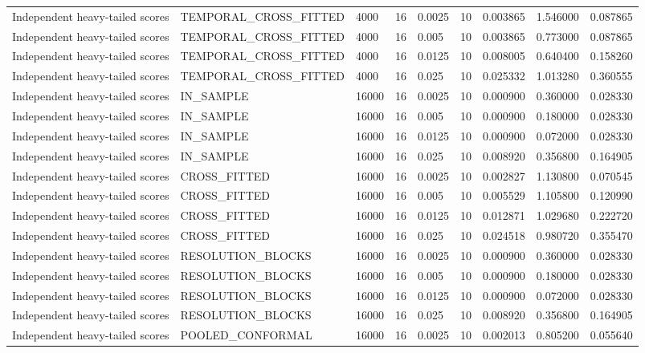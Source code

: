 \begin{tabular}{lllllllll}
Independent heavy-tailed scores & TEMPORAL\_CROSS\_FITTED & 4000 & 16 & 0.0025 & 10 & 0.003865 & 1.546000 & 0.087865 \\
Independent heavy-tailed scores & TEMPORAL\_CROSS\_FITTED & 4000 & 16 & 0.005 & 10 & 0.003865 & 0.773000 & 0.087865 \\
Independent heavy-tailed scores & TEMPORAL\_CROSS\_FITTED & 4000 & 16 & 0.0125 & 10 & 0.008005 & 0.640400 & 0.158260 \\
Independent heavy-tailed scores & TEMPORAL\_CROSS\_FITTED & 4000 & 16 & 0.025 & 10 & 0.025332 & 1.013280 & 0.360555 \\
Independent heavy-tailed scores & IN\_SAMPLE & 16000 & 16 & 0.0025 & 10 & 0.000900 & 0.360000 & 0.028330 \\
Independent heavy-tailed scores & IN\_SAMPLE & 16000 & 16 & 0.005 & 10 & 0.000900 & 0.180000 & 0.028330 \\
Independent heavy-tailed scores & IN\_SAMPLE & 16000 & 16 & 0.0125 & 10 & 0.000900 & 0.072000 & 0.028330 \\
Independent heavy-tailed scores & IN\_SAMPLE & 16000 & 16 & 0.025 & 10 & 0.008920 & 0.356800 & 0.164905 \\
Independent heavy-tailed scores & CROSS\_FITTED & 16000 & 16 & 0.0025 & 10 & 0.002827 & 1.130800 & 0.070545 \\
Independent heavy-tailed scores & CROSS\_FITTED & 16000 & 16 & 0.005 & 10 & 0.005529 & 1.105800 & 0.120990 \\
Independent heavy-tailed scores & CROSS\_FITTED & 16000 & 16 & 0.0125 & 10 & 0.012871 & 1.029680 & 0.222720 \\
Independent heavy-tailed scores & CROSS\_FITTED & 16000 & 16 & 0.025 & 10 & 0.024518 & 0.980720 & 0.355470 \\
Independent heavy-tailed scores & RESOLUTION\_BLOCKS & 16000 & 16 & 0.0025 & 10 & 0.000900 & 0.360000 & 0.028330 \\
Independent heavy-tailed scores & RESOLUTION\_BLOCKS & 16000 & 16 & 0.005 & 10 & 0.000900 & 0.180000 & 0.028330 \\
Independent heavy-tailed scores & RESOLUTION\_BLOCKS & 16000 & 16 & 0.0125 & 10 & 0.000900 & 0.072000 & 0.028330 \\
Independent heavy-tailed scores & RESOLUTION\_BLOCKS & 16000 & 16 & 0.025 & 10 & 0.008920 & 0.356800 & 0.164905 \\
Independent heavy-tailed scores & POOLED\_CONFORMAL & 16000 & 16 & 0.0025 & 10 & 0.002013 & 0.805200 & 0.055640 \\

\end{tabular}
